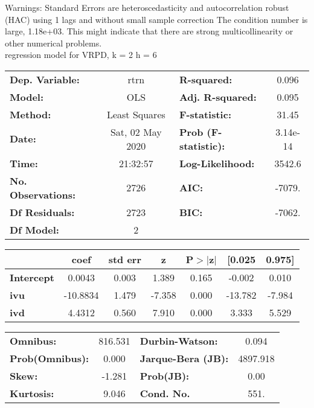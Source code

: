 Warnings: \newline
 [1] Standard Errors are heteroscedasticity and autocorrelation robust (HAC) using 1 lags and without small sample correction \newline
 [2] The condition number is large, 1.18e+03. This might indicate that there are \newline
 strong multicollinearity or other numerical problems.\\ 

regression model for VRPD, k = 2 h = 6\begin{center}
\begin{tabular}{lclc}
\toprule
\textbf{Dep. Variable:}    &       rtrn       & \textbf{  R-squared:         } &     0.096   \\
\textbf{Model:}            &       OLS        & \textbf{  Adj. R-squared:    } &     0.095   \\
\textbf{Method:}           &  Least Squares   & \textbf{  F-statistic:       } &     31.45   \\
\textbf{Date:}             & Sat, 02 May 2020 & \textbf{  Prob (F-statistic):} &  3.14e-14   \\
\textbf{Time:}             &     21:32:57     & \textbf{  Log-Likelihood:    } &    3542.6   \\
\textbf{No. Observations:} &        2726      & \textbf{  AIC:               } &    -7079.   \\
\textbf{Df Residuals:}     &        2723      & \textbf{  BIC:               } &    -7062.   \\
\textbf{Df Model:}         &           2      & \textbf{                     } &             \\
\bottomrule
\end{tabular}
\begin{tabular}{lcccccc}
                   & \textbf{coef} & \textbf{std err} & \textbf{z} & \textbf{P$> |$z$|$} & \textbf{[0.025} & \textbf{0.975]}  \\
\midrule
\textbf{Intercept} &       0.0043  &        0.003     &     1.389  &         0.165        &       -0.002    &        0.010     \\
\textbf{ivu}       &     -10.8834  &        1.479     &    -7.358  &         0.000        &      -13.782    &       -7.984     \\
\textbf{ivd}       &       4.4312  &        0.560     &     7.910  &         0.000        &        3.333    &        5.529     \\
\bottomrule
\end{tabular}
\begin{tabular}{lclc}
\textbf{Omnibus:}       & 816.531 & \textbf{  Durbin-Watson:     } &    0.094  \\
\textbf{Prob(Omnibus):} &   0.000 & \textbf{  Jarque-Bera (JB):  } & 4897.918  \\
\textbf{Skew:}          &  -1.281 & \textbf{  Prob(JB):          } &     0.00  \\
\textbf{Kurtosis:}      &   9.046 & \textbf{  Cond. No.          } &     551.  \\
\bottomrule
\end{tabular}
\end{center}

